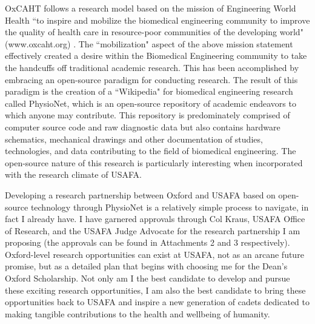 \documentclass{article}
\begin{document}
OxCAHT follows a research model based on the mission of Engineering World
Health ``to inspire and mobilize the biomedical engineering community to improve
the quality of health care in resource-poor communities of the developing
world" (www.oxcaht.org) . The ``mobilization" aspect of the above mission
statement effectively created a desire within the Biomedical Engineering 
community to take the handcuffs off traditional academic research. This has
been accomplished by embracing an open-source paradigm for conducting research.
The result of this paradigm is the creation of a ``Wikipedia" for biomedical
engineering research called PhysioNet, which is an open-source repository of
academic endeavors to which anyone may contribute. This repository is
predominately comprised of computer source code and raw diagnostic data but
also contains hardware schematics, mechanical drawings and other documentation
of studies, technologies, and data contributing to the field of biomedical
engineering. The open-source nature of this research is particularly
interesting when incorporated with the research climate of USAFA.
 
Developing a research partnership between Oxford and USAFA based on open-source
technology through PhysioNet is a relatively simple process to navigate, in fact I already have.
I have garnered approvals through Col Kraus, USAFA Office of Research, and the
USAFA Judge Advocate for the research partnership I am proposing (the
approvals can be found in Attachments 2 and 3
respectively). Oxford-level research opportunities can
exist at USAFA, not as an arcane future promise, but as a detailed plan that
begins with choosing me for the Dean's Oxford Scholarship. Not only am I the
best candidate to develop and pursue these exciting research opportunities, I
am also the best candidate to bring these opportunities back to USAFA and
inspire a new generation of cadets dedicated to making tangible contributions
to the health and wellbeing of humanity.
\end{document}
